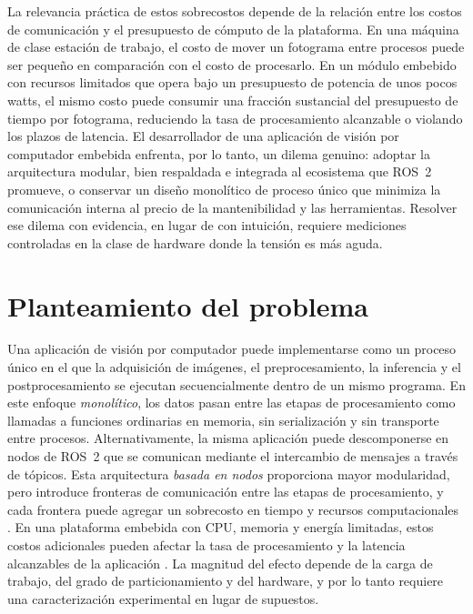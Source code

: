 La relevancia práctica de estos sobrecostos depende de la relación entre
los costos de comunicación y el presupuesto de cómputo de la plataforma. En
una máquina de clase estación de trabajo, el costo de mover un fotograma
entre procesos puede ser pequeño en comparación con el costo de procesarlo.
En un módulo embebido con recursos limitados que opera bajo un presupuesto
de potencia de unos pocos watts, el mismo costo puede consumir una fracción
sustancial del presupuesto de tiempo por fotograma, reduciendo la tasa de
procesamiento alcanzable o violando los plazos de latencia. El desarrollador
de una aplicación de visión por computador embebida enfrenta, por lo tanto,
un dilema genuino: adoptar la arquitectura modular, bien respaldada e
integrada al ecosistema que ROS~2 promueve, o conservar un diseño monolítico
de proceso único que minimiza la comunicación interna al precio de la
mantenibilidad y las herramientas. Resolver ese dilema con evidencia, en
lugar de con intuición, requiere mediciones controladas en la clase de
hardware donde la tensión es más aguda.

\section{Planteamiento del problema}
\label{sec:problem-statement}

Una aplicación de visión por computador puede implementarse como un proceso
único en el que la adquisición de imágenes, el preprocesamiento, la
inferencia y el postprocesamiento se ejecutan secuencialmente dentro de un
mismo programa. En este enfoque \emph{monolítico}, los datos pasan entre las
etapas de procesamiento como llamadas a funciones ordinarias en memoria, sin
serialización y sin transporte entre procesos. Alternativamente, la misma
aplicación puede descomponerse en nodos de ROS~2 que se comunican mediante
el intercambio de mensajes a través de tópicos. Esta arquitectura
\emph{basada en nodos} proporciona mayor modularidad, pero introduce
fronteras de comunicación entre las etapas de procesamiento, y cada frontera
puede agregar un sobrecosto en tiempo y recursos computacionales
\cite{maruyama2016, kronauer2021, kamiya2025, luo2025}. En una plataforma
embebida con CPU, memoria y energía limitadas, estos costos adicionales
pueden afectar la tasa de procesamiento y la latencia alcanzables de la
aplicación \cite{kronauer2021, macenski2023}. La magnitud del efecto depende
de la carga de trabajo, del grado de particionamiento y del hardware, y por
lo tanto requiere una caracterización experimental en lugar de supuestos.

